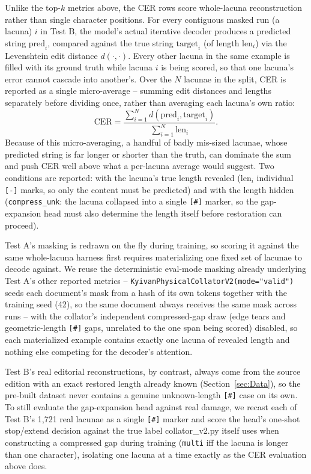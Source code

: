 \documentclass{article}
\begin{document}
Unlike the top-$k$ metrics above, the CER rows score whole-lacuna reconstruction rather than single character positions. For every contiguous masked run (a lacuna) $i$ in Test B, the model's actual iterative decoder produces a predicted string $\mathrm{pred}_i$, compared against the true string $\mathrm{target}_i$ (of length $\mathrm{len}_i$) via the Levenshtein edit distance $d(\cdot,\cdot)$. Every other lacuna in the same example is filled with its ground truth while lacuna $i$ is being scored, so that one lacuna's error cannot cascade into another's. Over the $N$ lacunae in the split, CER is reported as a single micro-average -- summing edit distances and lengths separately before dividing once, rather than averaging each lacuna's own ratio:
\[
\mathrm{CER} = \frac{\sum_{i=1}^{N} d(\mathrm{pred}_i, \mathrm{target}_i)}{\sum_{i=1}^{N} \mathrm{len}_i}.
\]
Because of this micro-averaging, a handful of badly mis-sized lacunae, whose predicted string is far longer or shorter than the truth, can dominate the sum and push CER well above what a per-lacuna average would suggest. Two conditions are reported: with the lacuna's true length revealed ($\mathrm{len}_i$ individual \texttt{[-]} marks, so only the content must be predicted) and with the length hidden (\texttt{compress\_unk}: the lacuna collapsed into a single \texttt{[\#]} marker, so the gap-expansion head must also determine the length itself before restoration can proceed).

Test A's masking is redrawn on the fly during training, so scoring it against the same whole-lacuna harness first requires materializing one fixed set of lacunae to decode against. We reuse the deterministic eval-mode masking already underlying Test A's other reported metrics -- \texttt{KyivanPhysicalCollatorV2(mode="valid")} seeds each document's mask from a hash of its own tokens together with the training seed (42), so the same document always receives the same mask across runs -- with the collator's independent compressed-gap draw (edge tears and geometric-length \texttt{[\#]} gaps, unrelated to the one span being scored) disabled, so each materialized example contains exactly one lacuna of revealed length and nothing else competing for the decoder's attention.

Test B's real editorial reconstructions, by contrast, always come from the source edition with an exact restored length already known (Section~\ref{sec:Data}), so the pre-built dataset never contains a genuine unknown-length \texttt{[\#]} case on its own. To still evaluate the gap-expansion head against real damage, we recast each of Test B's 1{,}721 real lacunae as a single \texttt{[\#]} marker and score the head's one-shot stop/extend decision against the true label collator\_v2.py itself uses when constructing a compressed gap during training (\texttt{multi} iff the lacuna is longer than one character), isolating one lacuna at a time exactly as the CER evaluation above does.
\end{document}
